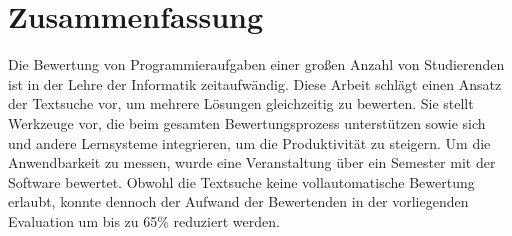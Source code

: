 \chapter*{Zusammenfassung}


Die Bewertung von Programmieraufgaben einer großen Anzahl von Studierenden ist in der Lehre der Informatik zeitaufwändig.
Diese Arbeit schlägt einen Ansatz der Textsuche vor, um mehrere Lösungen gleichzeitig zu bewerten.
Sie stellt Werkzeuge vor, die beim gesamten Bewertungsprozess unterstützen sowie sich und andere Lernsysteme integrieren, um die Produktivität zu steigern.
Um die Anwendbarkeit zu messen, wurde eine Veranstaltung über ein Semester mit der Software bewertet.
Obwohl die Textsuche keine vollautomatische Bewertung erlaubt, konnte dennoch der Aufwand der Bewertenden in der vorliegenden Evaluation um bis zu 65\% reduziert werden.
